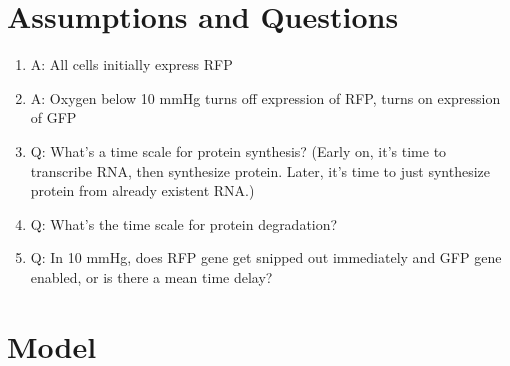 \documentclass[12pt]{article}
\begin{document}
\section{Assumptions and Questions}
\begin{enumerate}

\item 
A: All cells initially express RFP

\item 
A: Oxygen below 10 mmHg turns off expression of RFP, turns on expression of GFP

\item 
Q: What's a time scale for protein synthesis? (Early on, it's time to transcribe RNA, then synthesize protein. Later, it's time to just synthesize protein from already existent RNA.) 

\item 
Q: What's the time scale for protein degradation? 

\item 
Q: In 10 mmHg, does RFP gene get snipped out immediately and GFP gene enabled, or is there a mean time delay? 


\end{enumerate}

\section{Model}
\end{document}
